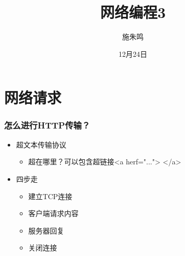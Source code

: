 \documentclass[AutoFakeBold]{beamer}
\title{网络编程3}
\author{施朱鸣}
\date{12月24日}
\begin{document}
    {
    
    \begin{frame}
    \titlepage
    \end{frame}

    \section{网络请求}
    \begin{frame}
        \frametitle{怎么进行HTTP传输？}
    
        \begin{itemize}
            \item 超文本传输协议\begin{itemize}
                \item 超在哪里？可以包含超链接<a herf="..."> </a>
            \end{itemize}
            \item 四步走\begin{itemize}
                \item 建立TCP连接
                \item 客户端请求内容
                \item 服务器回复
                \item 关闭连接
            \end{itemize}
        \end{itemize}


\end{frame}}
\end{document}
